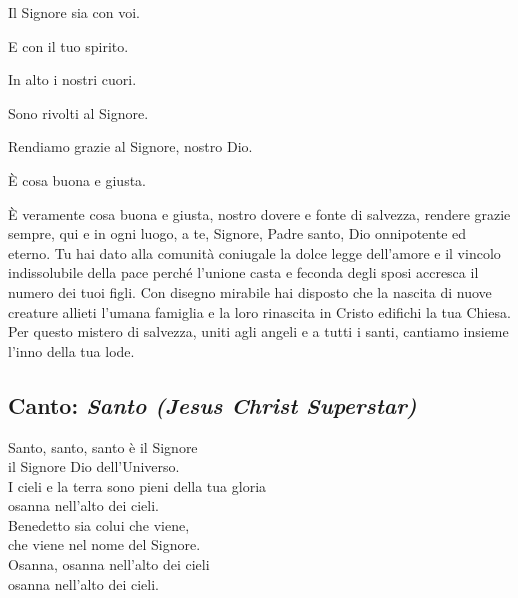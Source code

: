 	\begin{dialoghi}
		\item[\sacerdote] Il Signore sia con voi.
		\item[\assemblea] E con il tuo spirito.
		\item[\sacerdote] In alto i nostri cuori.
		\item[\assemblea] Sono rivolti al Signore.
		\item[\sacerdote] Rendiamo grazie al Signore, nostro Dio.
		\item[\assemblea] È cosa buona e giusta.
		\item[\sacerdote] È veramente cosa buona e giusta, nostro dovere e fonte di salvezza, rendere grazie sempre, qui e in ogni luogo, a te, Signore, Padre santo, Dio onnipotente ed eterno. Tu hai dato alla comunità coniugale la dolce legge dell'amore e il vincolo indissolubile della pace perché l'unione casta e feconda degli sposi accresca il numero dei tuoi figli. Con disegno mirabile hai disposto che la nascita di nuove creature allieti l'umana famiglia e la loro rinascita in Cristo edifichi la tua Chiesa. Per questo mistero di salvezza, uniti agli angeli e a tutti i santi, cantiamo insieme l'inno della tua lode.
	\end{dialoghi}

\subsection*{Canto: \textit{Santo (Jesus Christ Superstar)}}

	\begin{mystrofe}
		Santo, santo, santo è il Signore \\
		il Signore Dio dell'Universo. \\
		I cieli e la terra sono pieni della tua gloria \\
		osanna nell'alto dei cieli. \\
		Benedetto sia colui che viene, \\
		che viene nel nome del Signore. \\
		Osanna, osanna nell'alto dei cieli \\
		osanna nell'alto dei cieli.
	\end{mystrofe}

